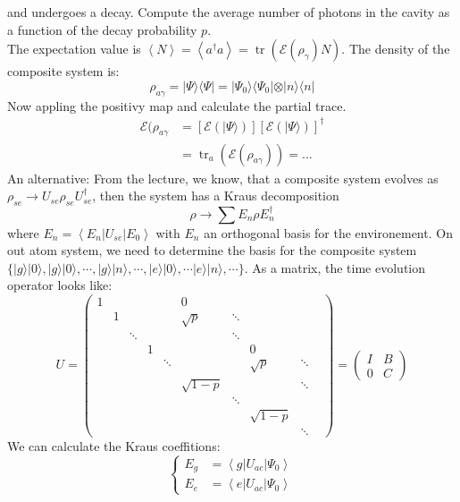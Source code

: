 \documentclass[12pt]{book}
\theoremstyle{definition}
\newcommand{\scalar}[1]{\left\langle {#1}\right\rangle}
\let\oldsum\sum
\renewcommand{\sum}[2]{\oldsum\limits_{#1}^{#2}}
\renewcommand{\to}{\longrightarrow}
\newcommand{\bra}[1]{\langle {#1} \vert}
\newcommand{\ket}[1]{\vert {#1} \rangle}
\DeclareMathOperator{\tr}{tr}
\begin{document}
and undergoes a decay. Compute the average number of photons in the cavity as a function of the decay probability $p$. \\
The expectation value is $\scalar{N} = \scalar{a^\dagger a} = \tr(\mathcal E(\rho_{\gamma}) N)$. The density of the composite system is:
\begin{equation}
  \rho_{a\gamma} = \ket{\Psi}\bra{\Psi} = \ket{\Psi_0} \bra{\Psi_0} \otimes \ket{n}\bra{n}
\end{equation}
Now appling the positivy map and calculate the partial trace.
\begin{align*}
  \mathcal E(\rho_{a\gamma} & = \left[\mathcal E (\ket{\Psi})\right]\left[\mathcal E (\ket{\Psi})\right]^\dagger \\
  & = \tr_a(\mathcal E(\rho_{a\gamma})) = ...
\end{align*}
An alternative: From the lecture, we know, that a composite system evolves as $\rho_{se} \to U_{se} \rho_{se} U_{se}^\dagger$, then the system has a Kraus decomposition
\begin{equation*}
  \rho \to \oldsum E_n \rho E_n^\dagger
\end{equation*}
where $E_n = \scalar{E_n \vert U_{se} \vert E_0}$ with $E_n$ an orthogonal basis for the environement. On out atom system, we need to determine the basis for the composite system $\{\ket{g} \ket{0}, \ket{g}\ket{0}, \cdots, \ket{g} \ket{n}, \cdots, \ket{e}\ket{0}, \cdots \ket{e}\ket{n}, \cdots\}$.
As a matrix, the time evolution operator looks like:
\begin{equation*}
  U =
  \begin{pmatrix}
    1 &&&&& 0 &&&& \\
    & 1 & &&& \sqrt{p} & \ddots \\
    && \ddots &&&& \ddots \\
    &&& 1 &&&& 0 \\
    &&&& \ddots &&& \sqrt{p} & \ddots \\
    &&&&& \sqrt{1 - p} &&& \ddots \\
    &&&&&& \ddots  \\
    &&&&&&& \sqrt{1 - p} \\
    &&&&&&&& \ddots
  \end{pmatrix} =
  \begin{pmatrix}
    I & B \\
    0 & C
  \end{pmatrix}
\end{equation*}
We can calculate the Kraus coeffitions:
\begin{equation*}
  \begin{cases}
    E_g & = \scalar{g \vert U_{ac} \vert \Psi_0} \\
    E_e & = \scalar{e \vert U_{ac} \vert \Psi_0}
  \end{cases}
\end{equation*}
\end{document}

